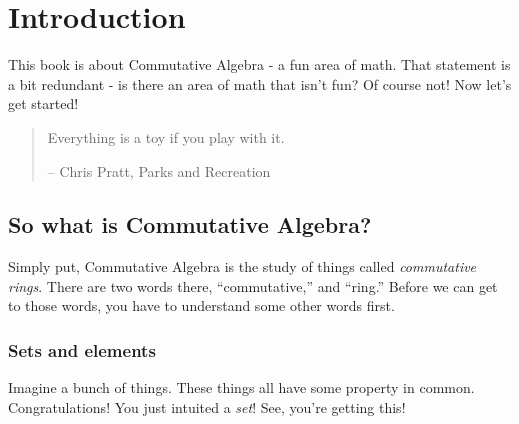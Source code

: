 \newcommand{\ssa}{\subsubsection*}
\newcommand{\n}{\eta}
\newcommand{\Z}{\mathbb{Z}}

\newcommand{\1}{\hspace{1pt}}
\newcommand{\2}{\hspace{2pt}}
\newcommand{\3}{\hspace{3pt}}

\renewcommand{\,}{,\hspace{1pt}}
\renewcommand{\;}{;\hspace{3pt}}
\renewcommand{\~}{\backsim}

\renewcommand{\B}{\beta}
\renewcommand{\b}{\textbf}
\renewcommand{\i}{\emph}
\renewcommand{\l}{\lambda}
\renewcommand{\ng}{\mathrm{neg}\2}
\renewcommand{\v}{\curlyvee}

\chapter{Introduction}

This book is about Commutative Algebra - a fun area of math. That statement is a
bit redundant - is there an area of math that isn't fun? Of course not! Now
let's get started!

\begin{quotation}
  Everything is a toy if you play with it.

  -- Chris Pratt, Parks and Recreation
\end{quotation}


\section{So what is Commutative Algebra?}

Simply put, Commutative Algebra is the study of things called \i{commutative
  rings}. There are two words there, ``commutative,'' and ``ring.'' Before we
can get to those words, you have to understand some other words first.


\subsection{Sets and elements}

Imagine a bunch of things. These things all have some property in
common. Congratulations! You just intuited a \i{set}! See, you're getting this!

